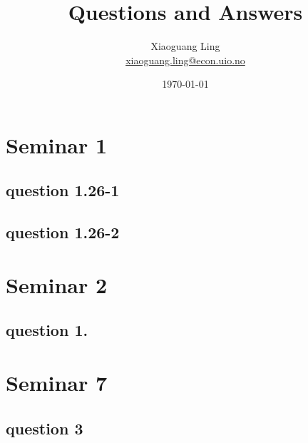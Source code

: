 \documentclass{article}
\title{Questions and Answers}
\author{Xiaoguang Ling \\  \href{xiaoguang.ling@econ.uio.no}{xiaoguang.ling@econ.uio.no}}
\date{\today}
\begin{document}
\maketitle

\tableofcontents


\section{Seminar 1}

\subsection{question 1.26-1}

\subsection{question 1.26-2}

\section{Seminar 2}

\subsection{question 1.}

\section{Seminar 7}
\subsection{question 3}
\end{document}
